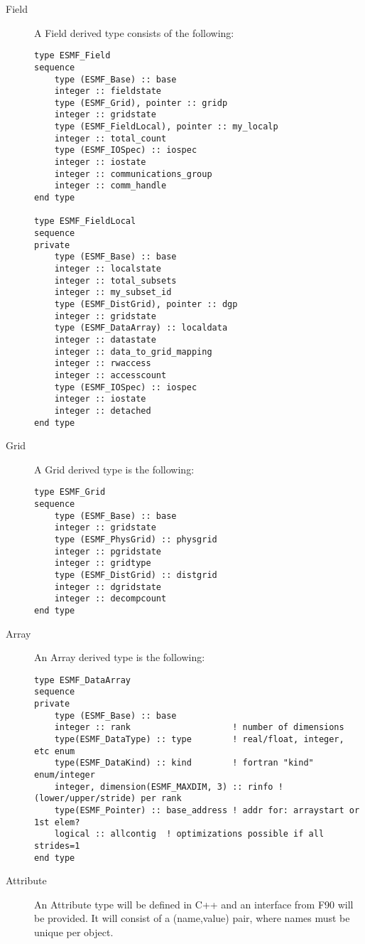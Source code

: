 

\begin{description}

\item [Field] A Field derived type consists of the following:
\begin{verbatim}
type ESMF_Field
sequence
    type (ESMF_Base) :: base
    integer :: fieldstate
    type (ESMF_Grid), pointer :: gridp
    integer :: gridstate
    type (ESMF_FieldLocal), pointer :: my_localp
    integer :: total_count
    type (ESMF_IOSpec) :: iospec
    integer :: iostate
    integer :: communications_group
    integer :: comm_handle
end type

type ESMF_FieldLocal
sequence
private
    type (ESMF_Base) :: base
    integer :: localstate
    integer :: total_subsets
    integer :: my_subset_id
    type (ESMF_DistGrid), pointer :: dgp
    integer :: gridstate
    type (ESMF_DataArray) :: localdata
    integer :: datastate
    integer :: data_to_grid_mapping
    integer :: rwaccess
    integer :: accesscount
    type (ESMF_IOSpec) :: iospec
    integer :: iostate
    integer :: detached
end type

\end{verbatim}

\item [Grid] A Grid derived type is the following:
\begin{verbatim}
type ESMF_Grid
sequence
    type (ESMF_Base) :: base
    integer :: gridstate
    type (ESMF_PhysGrid) :: physgrid
    integer :: pgridstate
    integer :: gridtype
    type (ESMF_DistGrid) :: distgrid
    integer :: dgridstate
    integer :: decompcount
end type
\end{verbatim}

\item [Array] An Array derived type is the following:
\begin{verbatim}
type ESMF_DataArray
sequence
private
    type (ESMF_Base) :: base
    integer :: rank                    ! number of dimensions
    type(ESMF_DataType) :: type        ! real/float, integer, etc enum
    type(ESMF_DataKind) :: kind        ! fortran "kind" enum/integer
    integer, dimension(ESMF_MAXDIM, 3) :: rinfo ! (lower/upper/stride) per rank
    type(ESMF_Pointer) :: base_address ! addr for: arraystart or 1st elem?
    logical :: allcontig  ! optimizations possible if all strides=1
end type
\end{verbatim}

\item [Attribute] An Attribute type will be defined in C++ and an
interface from F90 will be provided.  It will consist of a (name,value)
pair, where names must be unique per object.

\end{description}



